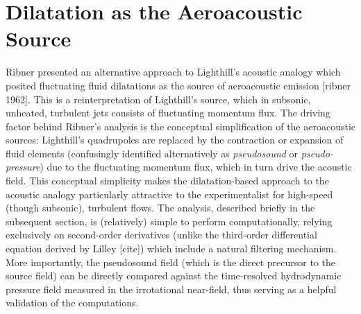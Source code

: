 \chapter{Dilatation as the Aeroacoustic Source}
Ribner presented an alternative approach to Lighthill's acoustic analogy which posited fluctuating fluid dilatations as the source of aeroacoustic emission [ribner 1962].
This is a reinterpretation of Lighthill's source, which in subsonic, unheated, turbulent jets consists of fluctuating momentum flux.
The driving factor behind Ribner's analysis is the conceptual simplification of the aeroacoustic sources: Lighthill's quadrupoles are replaced by the contraction or expansion of fluid elements (confusingly identified alternatively as \emph{pseudosound} or \emph{pseudo-pressure}) due to the fluctuating momentum flux, which in turn drive the acoustic field.
This conceptual simplicity makes the dilatation-based approach to the acoustic analogy particularly attractive to the experimentalist for high-speed (though subsonic), turbulent flows.
The analysis, described briefly in the subsequent section, is (relatively) simple to perform computationally, relying exclusively on second-order derivatives (unlike the third-order differential equation derived by Lilley [cite]) which include a natural filtering mechanism.
More importantly, the pseudosound field (which is the direct precursor to the source field) can be directly compared against the time-resolved hydrodynamic pressure field measured in the irrotational near-field, thus serving as a helpful validation of the computations.

